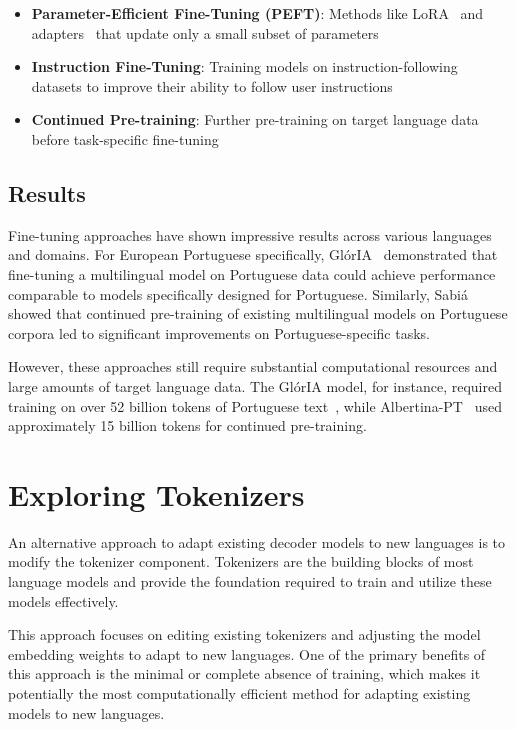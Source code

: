 \begin{itemize}
    \item \textbf{Parameter-Efficient Fine-Tuning (PEFT)}: Methods like LoRA~\cite{hu2021lora} and adapters~\cite{houlsby2019parameter} that update only a small subset of parameters
    \item \textbf{Instruction Fine-Tuning}: Training models on instruction-following datasets to improve their ability to follow user instructions~\cite{wei2021finetuned}
    \item \textbf{Continued Pre-training}: Further pre-training on target language data before task-specific fine-tuning~\cite{gururangan2020don}
\end{itemize}

\subsection{Results}
Fine-tuning approaches have shown impressive results across various languages and domains. For European Portuguese specifically, GlórIA~\cite{Gloria} demonstrated that fine-tuning a multilingual model on Portuguese data could achieve performance comparable to models specifically designed for Portuguese. Similarly, Sabiá~\cite{Sabia} showed that continued pre-training of existing multilingual models on Portuguese corpora led to significant improvements on Portuguese-specific tasks.

However, these approaches still require substantial computational resources and large amounts of target language data. The GlórIA model, for instance, required training on over 52 billion tokens of Portuguese text~\cite{Gloria}, while Albertina-PT~\cite{Albertina} used approximately 15 billion tokens for continued pre-training.

\section{Exploring Tokenizers}\label{Section3.2}
An alternative approach to adapt existing decoder models to new languages is to modify the tokenizer component. Tokenizers are the building blocks of most language models and provide the foundation required to train and utilize these models effectively.

This approach focuses on editing existing tokenizers and adjusting the model embedding weights to adapt to new languages. One of the primary benefits of this approach is the minimal or complete absence of training, which makes it potentially the most computationally efficient method for adapting existing models to new languages.

